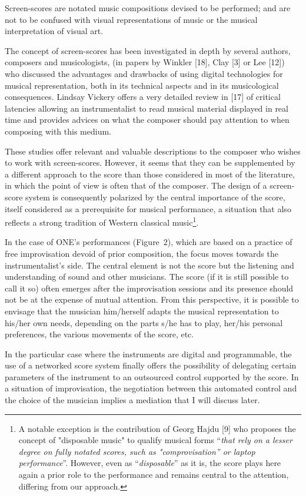 Screen-scores are notated music compositions devised to be performed; and are not to be confused with visual representations of music or the musical interpretation of visual art.

The concept of screen-scores has been investigated in depth by several authors, composers and musicologists, (in papers by Winkler [18], Clay [3] or Lee [12]) who discussed the advantages and drawbacks of using digital technologies for musical representation, both in its technical aspects and in its musicological consequences. Lindsay Vickery offers a very detailed review in [17] of critical latencies allowing an instrumentalist to read musical material displayed in real time and provides advices on what the composer should pay attention to when composing with this medium.

These studies offer relevant and valuable descriptions to the composer who wishes to work with screen-scores. However, it seems that they can be supplemented by a different approach to the score than those considered in most of the literature, in which the point of view is often that of the composer. The design of a screen-score system is consequently polarized by the central importance of the score, itself considered as a prerequisite for musical performance, a situation that also reflects a strong tradition of Western classical music\footnote{A notable exception is the contribution of Georg Hajdu [9] who proposes the concept of "disposable music" to qualify musical forms “\textit{that rely on a lesser degree on fully notated scores, such as "comprovisation” or laptop performance}”. However, even as “\textit{disposable}” as it is, the score plays here again a prior role to the performance and remains central to the attention, differing from our approach.}.

In the case of ONE's performances (Figure 2), which are based on a practice of free improvisation devoid of prior composition, the focus moves towards the instrumentalist's side. The central element is not the score but the listening and understanding of sound and other musicians. The score (if it is still possible to call it so) often emerges after the improvisation sessions and its presence should not be at the expense of mutual attention. From this perspective, it is possible to envisage that the musician him/herself adapts the musical representation to his/her own needs, depending on the parts s/he has to play, her/his personal preferences, the various movements of the score, etc.

In the particular case where the instruments are digital and programmable, the use of a networked score system finally offers the possibility of delegating certain parameters of the instrument to an outsourced control supported by the score. In a situation of improvisation, the negotiation between this automated control and the choice of the musician implies a mediation that I will discuss later.

